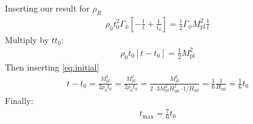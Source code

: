 \documentclass[13pt,a4paper]{article}
\begin{document}
Inserting our result for $\rho_R$
\begin{align}
\rho_0 t_0^2 \Gamma_\phi \left[  - \frac{1}{t} + \frac{1}{t_0}  \right] = \frac{1}{2} \Gamma_\phi M_{\mathrm{pl}}^2 \frac{1}{t}
\end{align}
Multiply by $t t_0$:
\begin{align}
\rho_0 t_0 \left[ t - t_0 \right] = \frac{1}{2} M_{\mathrm{pl}}^2
\end{align}
Then inserting \eqref{eq:initial}
\begin{align}
t - t_0 = \frac{M_{\mathrm{pl}}^2}{2 \rho_0 t_0}
= \frac{M_{\mathrm{pl}}^2}{2 \rho_0 t_0}
= \frac{M_{\mathrm{pl}}^2}{2 \cdot 3 M_{\mathrm{pl}}^2 H_{\mathrm{inf}}^2 \cdot 1 / H_{\mathrm{inf}}}
= \frac{1}{6} \frac{1}{H_{\mathrm{inf}}} = \frac{1}{6} t_0
\end{align}
Finally:
\begin{align}
    t_{\mathrm{max}} = \frac{7}{6} t_0
\end{align}



\newpage
\printbibliography
\end{document}
